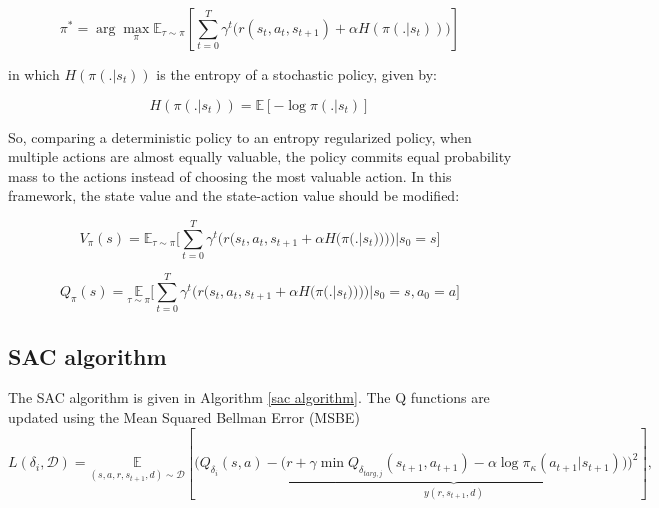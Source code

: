\begin{equation}
	\pi^* = \arg \max_\pi \mathbb{E}_{\tau \sim \pi} [\sum_{t=0}^{T} \gamma^t \big( r(s_t,a_t,s_{t+1}) + \alpha H(\pi(.|s_t)) \big)]
\end{equation}

in which $H(\pi(.|s_t))$ is the entropy of a stochastic policy, given by:

\begin{equation}
	H(\pi(.|s_t)) =  \mathbb{E}[-\log \pi(.|s_t)]
\end{equation}

So, comparing a deterministic policy to an entropy regularized policy, when multiple actions are almost equally valuable, the policy commits equal probability mass to the actions instead of choosing the most valuable action. In this framework, the state value and the state-action value should be modified:

\begin{equation}
	V_\pi(s) = \mathbb{E}_{\tau \sim \pi}\Bigg[\sum_{t=0}^{T} \gamma^t \bigg( r\Big(s_t,a_t,s_{t+1}+\alpha H\big(\pi(.|s_t)\big)\Big) \bigg)|s_0=s\Bigg]
\end{equation}

\begin{equation}
	Q_\pi(s) =  \underset{\tau \sim \pi}{\mathbb{E}}\Bigg[\sum_{t=0}^{T} \gamma^t \bigg( r\Big(s_t,a_t,s_{t+1}+\alpha H\big(\pi(.|s_t)\big)\Big) \bigg)|s_0=s, a_0=a\Bigg]
\end{equation}

\subsection{SAC algorithm}

The SAC algorithm is given in Algorithm \ref{sac algorithm}. The Q functions are updated using the Mean Squared Bellman Error (MSBE)\\

\begin{equation}
	L(\delta_i, {\mathcal D}) = \underset{(s,a,r,s_{t+1},d) \sim {\mathcal D}}{{\mathbb{E}}}\left[
	\Bigg( Q_{\delta_i}(s,a) -  \underbrace{\big(r + \gamma \min Q_{\delta_{targ,j}}(s_{t+1}, a_{t+1}) - \alpha \log \pi_{\kappa}(a_{t+1}|s_{t+1})\big)}_{y(r,s_{t+1},d)} \Bigg)^2
	\right],
\end{equation}

